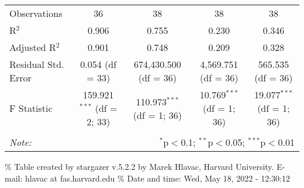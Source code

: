 \documentclass[
  landscape]{article}
\begin{document}
\begin{table}[!htbp]
\begin{tabular}{@{\extracolsep{5pt}}lcccc}
Observations & 36 & 38 & 38 & 38 \\ 
R$^{2}$ & 0.906 & 0.755 & 0.230 & 0.346 \\ 
Adjusted R$^{2}$ & 0.901 & 0.748 & 0.209 & 0.328 \\ 
Residual Std. Error & 0.054 (df = 33) & 674,430.500 (df = 36) & 4,569.751 (df = 36) & 565.535 (df = 36) \\ 
F Statistic & 159.921$^{***}$ (df = 2; 33) & 110.973$^{***}$ (df = 1; 36) & 10.769$^{***}$ (df = 1; 36) & 19.077$^{***}$ (df = 1; 36) \\ 
\hline 
\hline \\[-1.8ex] 
\textit{Note:}  & \multicolumn{4}{r}{$^{*}$p$<$0.1; $^{**}$p$<$0.05; $^{***}$p$<$0.01} \\ 
\end{tabular} 
\end{table}

\% Table created by stargazer v.5.2.2 by Marek Hlavac, Harvard
University. E-mail: hlavac at fas.harvard.edu \% Date and time: Wed, May
18, 2022 - 12:30:12
\end{document}
